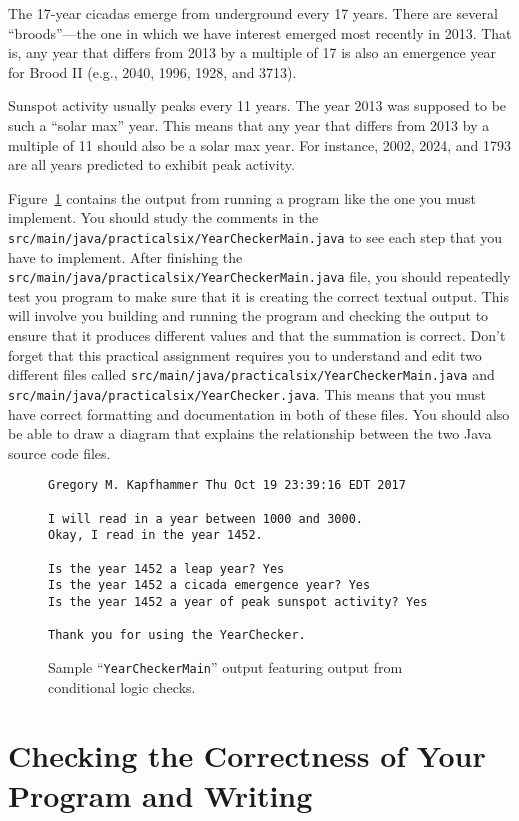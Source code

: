 \documentclass[11pt]{article}
\newcommand{\mainprogramsource}{\lstinline{src/main/java/practicalsix/YearCheckerMain.java}}
\newcommand{\secondprogramsource}{\lstinline{src/main/java/practicalsix/YearChecker.java}}
\begin{document}
\noindent The 17-year cicadas emerge from underground every 17 years. There are several ``broods''---the one in which we
have interest emerged most recently in 2013. That is, any year that differs from 2013 by a multiple of 17 is also an
emergence year for Brood II (e.g., 2040, 1996, 1928, and 3713).

\noindent Sunspot activity usually peaks every 11 years. The year 2013 was supposed to be such a ``solar max'' year.
This means that any year that differs from 2013 by a multiple of 11 should also be a solar max year. For instance, 2002,
2024, and 1793 are all years predicted to exhibit peak activity.


Figure~\ref{mad} contains the output from running a program like the one you must implement. You should study the
comments in the \mainprogramsource{} to see each step that you have to implement. After finishing the
\mainprogramsource{} file, you should repeatedly test you program to make sure that it is creating the correct textual
output. This will involve you building and running the program and checking the output to ensure that it produces
different values and that the summation is correct. Don't forget that this practical assignment requires you to
understand and edit two different files called \mainprogramsource{} and \secondprogramsource{}. This means that you must
have correct formatting and documentation in both of these files. You should also be able to draw a diagram that
explains the relationship between the two Java source code files.

\begin{figure}[tb]
\begin{Verbatim}[commandchars=\\\{\}]
Gregory M. Kapfhammer Thu Oct 19 23:39:16 EDT 2017

I will read in a year between 1000 and 3000.
Okay, I read in the year 1452.

Is the year 1452 a leap year? Yes
Is the year 1452 a cicada emergence year? Yes
Is the year 1452 a year of peak sunspot activity? Yes

Thank you for using the YearChecker.
\end{Verbatim}
\vspace*{-.1in}
\caption{Sample ``{\tt YearCheckerMain}'' output featuring output from conditional logic checks.}
\label{mad}
\end{figure}

\section*{Checking the Correctness of Your Program and Writing}
\end{document}
